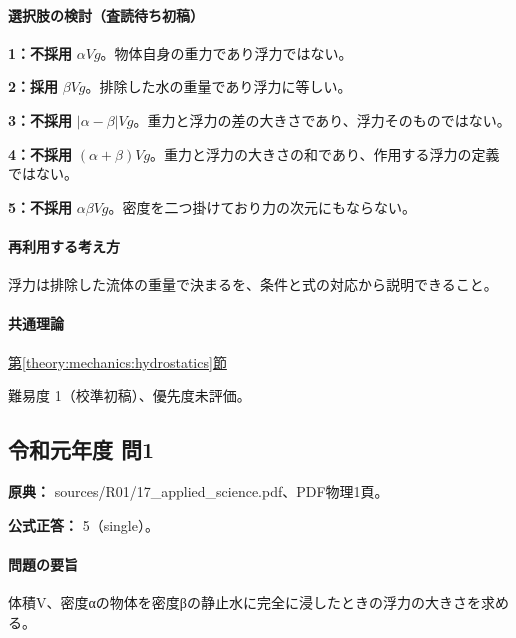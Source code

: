 \paragraph{選択肢の検討（査読待ち初稿）}\mbox{}\par

\noindent\textbf{1：不採用} \(\alpha Vg\)。物体自身の重力であり浮力ではない。\par

\noindent\textbf{2：採用} \(\beta Vg\)。排除した水の重量であり浮力に等しい。\par

\noindent\textbf{3：不採用} \(|\alpha-\beta|Vg\)。重力と浮力の差の大きさであり、浮力そのものではない。\par

\noindent\textbf{4：不採用} \((\alpha+\beta)Vg\)。重力と浮力の大きさの和であり、作用する浮力の定義ではない。\par

\noindent\textbf{5：不採用} \(\alpha\beta Vg\)。密度を二つ掛けており力の次元にもならない。\par

\paragraph{再利用する考え方} 浮力は排除した流体の重量で決まるを、条件と式の対応から説明できること。

\paragraph{共通理論} \hyperref[theory:mechanics:hydrostatics]{第\ref*{theory:mechanics:hydrostatics}節}

\par 難易度 1（校準初稿）、優先度未評価。

\subsection{令和元年度 問1}
\label{q:r01-reg-applied-01}

\noindent\textbf{原典：} sources/R01/17\_applied\_science.pdf、PDF物理1頁。

\textbf{公式正答：} 5（single）。

\paragraph{問題の要旨} 体積V、密度αの物体を密度βの静止水に完全に浸したときの浮力の大きさを求める。

